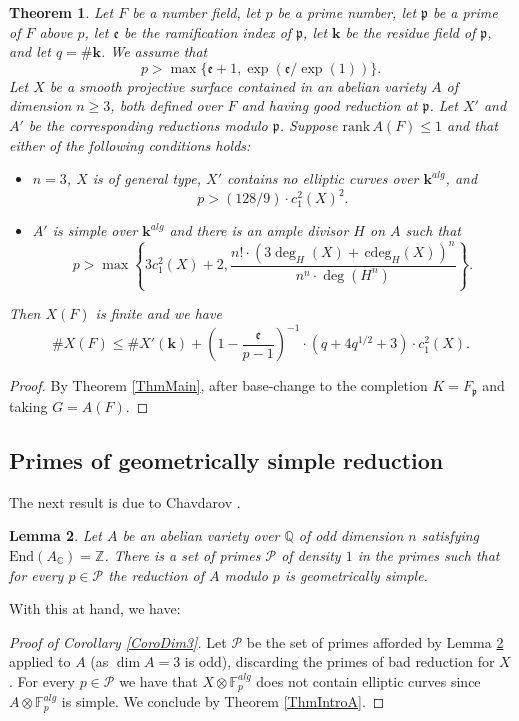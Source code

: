 \documentclass[11pt]{amsart}
\newtheorem{theorem}{Theorem}[section]
\newtheorem{lemma}[theorem]{Lemma}
\theoremstyle{remark}
\numberwithin{equation}{section}
\newcommand{\pfrak}{\mathfrak{p}}
\newcommand{\efrak}{\mathfrak{e}}
\newcommand{\Pcal}{\mathscr{P}}
\newcommand{\Z}{\mathbb{Z}}
\newcommand{\C}{\mathbb{C}}
\newcommand{\F}{\mathbb{F}}
\newcommand{\Q}{\mathbb{Q}}
\newcommand{\kk}{\mathbf{k}}
\newcommand{\End}{\mathrm{End}}
\newcommand{\rk}{\mathrm{rank}\,}
\newcommand{\cdeg}{\,\mathrm{cdeg}}
\begin{document}
\begin{theorem}\label{ThmFinalMain} Let $F$ be a number field, let $p$ be a prime number, let $\pfrak$ be a prime of $F$ above $p$, let $\efrak$ be the ramification index of $\pfrak$, let $\kk$ be the residue field of $\pfrak$, and let $q=\#\kk$. We assume that 
$$
p>\max\{\efrak+1, \exp(\efrak/\exp(1))\}.
$$
Let $X$ be a smooth projective surface contained in an abelian variety $A$ of dimension $n\ge 3$, both defined over $F$ and having good reduction at $\pfrak$. Let $X'$ and $A'$ be the corresponding reductions modulo $\pfrak$. Suppose  $\rk A(F)\le 1$ and that either of the following conditions holds:
\begin{itemize}
\item[(i)] $n=3$, $X$ is of general type, $X'$ contains no elliptic curves over $\kk^{alg}$, and 
$$
p> (128/9)\cdot c_1^2(X)^2.
$$ 
\item[(ii)] $A'$ is simple over $\kk^{alg}$ and there is an ample divisor $H$ on $A$ such that
$$
p> \max\left\{3 c_1^2(X)+2,\frac{n!\cdot (3\deg_H(X) + \cdeg_H(X))^n}{n^n\cdot \deg(H^n)}\right\}.
$$
\end{itemize}
Then $X(F)$ is finite and we have
$$
\# X(F) \le \# X'(\kk) + \left(1-\frac{\efrak}{p-1}\right)^{-1}\cdot (q+4q^{1/2}+3)\cdot c_1^2(X).
$$
\end{theorem}
\begin{proof} By Theorem \ref{ThmMain}, after base-change to the completion $K=F_\pfrak$ and taking $G=A(F)$. 
\end{proof}




\subsection{Primes of geometrically simple reduction} \label{SecApp2} The next result is due to Chavdarov \cite{Chavdarov}.
\begin{lemma}\label{LemmaCha} Let $A$ be an abelian variety over $\Q$ of odd dimension $n$ satisfying $\End (A_\C)=\Z$. There is a set of primes $\Pcal$ of density $1$ in the primes such that for every $p\in \Pcal$ the reduction of $A$ modulo $p$ is geometrically simple.
\end{lemma}
With this at hand, we have:

\begin{proof}[Proof of Corollary \ref{CoroDim3}] Let $\Pcal$ be the set of primes afforded by Lemma \ref{LemmaCha} applied to $A$ (as $\dim A=3$ is odd), discarding the primes of bad reduction for $X$. For every $p\in \Pcal$ we have that $X\otimes \F_p^{alg}$ does not contain elliptic curves since $A\otimes \F_p^{alg}$ is simple. We conclude by Theorem \ref{ThmIntroA}.
\end{proof}
\end{document}
